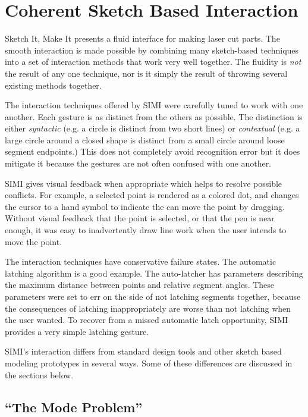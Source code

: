 \section{Coherent Sketch Based Interaction}

Sketch It, Make It presents a fluid interface for making laser cut
parts. The smooth interaction is made possible by combining many
sketch-based techniques into a set of interaction methods that work
very well together. The fluidity is \textit{not} the result of any one
technique, nor is it simply the result of throwing several existing
methods together.

The interaction techniques offered by SIMI were carefully tuned to
work with one another. Each gesture is as distinct from the others as
possible. The distinction is either \textit{syntactic} (e.g. a circle
is distinct from two short lines) or \textit{contextual} (e.g. a large
circle around a closed shape is distinct from a small circle around
loose segment endpoints.) This does not completely avoid recognition
error but it does mitigate it because the gestures are not often
confused with one another.

SIMI gives visual feedback when appropriate which helps to resolve
possible conflicts. For example, a selected point is rendered as a
colored dot, and changes the cursor to a hand symbol to indicate the
can move the point by dragging. Without visual feedback that the point
is selected, or that the pen is near enough, it was easy to
inadvertently draw line work when the user intends to move the point.

The interaction techniques have conservative failure states. The
automatic latching algorithm is a good example. The auto-latcher has
parameters describing the maximum distance between points and relative
segment angles. These parameters were set to err on the side of not
latching segments together, because the consequences of latching
inappropriately are worse than not latching when the user wanted. To
recover from a missed automatic latch opportunity, SIMI provides a
very simple latching gesture.

SIMI's interaction differs from standard design tools and other sketch
based modeling prototypes in several ways. Some of these differences
are discussed in the sections below.

\subsection{``The Mode Problem''}

